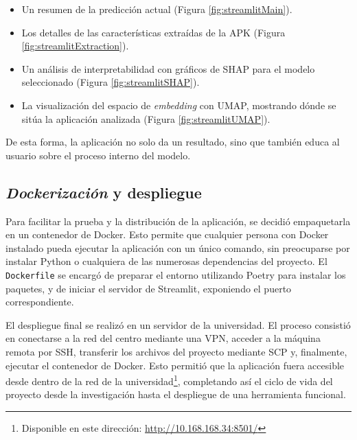 \begin{itemize}
	\item Un resumen de la predicción actual (Figura \ref{fig:streamlitMain}).
	
	\item Los detalles de las características extraídas de la APK (Figura \ref{fig:streamlitExtraction}).
	
	\item Un análisis de interpretabilidad con gráficos de SHAP para el modelo seleccionado (Figura \ref{fig:streamlitSHAP}).
	
	\item La visualización del espacio de \textit{embedding} con UMAP, mostrando dónde se sitúa la aplicación analizada (Figura \ref{fig:streamlitUMAP}).
\end{itemize}

De esta forma, la aplicación no solo da un resultado, sino que también educa al usuario sobre el proceso interno del modelo.

\subsection{\textit{Dockerización} y despliegue}

Para facilitar la prueba y la distribución de la aplicación, se decidió empaquetarla en un contenedor de Docker. Esto permite que cualquier persona con Docker instalado pueda ejecutar la aplicación con un único comando, sin preocuparse por instalar Python o cualquiera de las numerosas dependencias del proyecto. El \texttt{Dockerfile} se encargó de preparar el entorno utilizando Poetry para instalar los paquetes, y de iniciar el servidor de Streamlit, exponiendo el puerto correspondiente.

El despliegue final se realizó en un servidor de la universidad. El proceso consistió en conectarse a la red del centro mediante una VPN, acceder a la máquina remota por SSH, transferir los archivos del proyecto mediante SCP y, finalmente, ejecutar el contenedor de Docker. Esto permitió que la aplicación fuera accesible desde dentro de la red de la universidad\footnote{Disponible en este dirección: \url{http://10.168.168.34:8501/}}, completando así el ciclo de vida del proyecto desde la investigación hasta el despliegue de una herramienta funcional.
